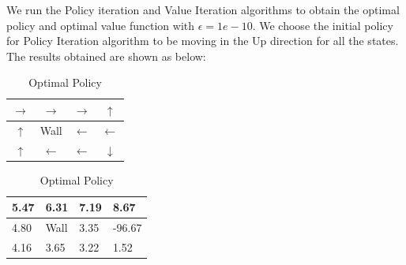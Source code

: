 \documentclass{article}
\begin{document}
\noindent %
We run the Policy iteration and Value Iteration algorithms to obtain the optimal policy and optimal value function with $\epsilon = 1e-10$.
We choose the initial policy for Policy Iteration algorithm to be moving in the Up direction for all the states. The results obtained are shown as below:

\begin{table}[H]
    \renewcommand{\arraystretch}{2}
    \begin{minipage}{.5\textwidth}
        \begin{center}
        \begin{tabular}{ | c | c| c | c | } 
            \hline
            $\rightarrow$ & $\rightarrow$ & $\rightarrow$ & \cellcolor{green!25}$\uparrow$ \\ 
            \hline
            $\uparrow$ & \cellcolor{gray!50}Wall & $\leftarrow$ & \cellcolor{red!25}$\leftarrow$ \\ 
            \hline
            $\uparrow$ & $\leftarrow$ & $\leftarrow$ & $\downarrow$ \\ 
            \hline
        \end{tabular}
        \caption{Optimal Policy}
        \end{center}
    \end{minipage}%
    \begin{minipage}{.5\textwidth}
        \begin{center}
        \begin{tabular}{ | m{1cm} | m{1cm}| m{1cm} | m{1cm} | } 
            \hline
            5.47 & 6.31 & 7.19 & \cellcolor{green!25}8.67 \\ 
            \hline
            4.80 & \cellcolor{gray!25}Wall & 3.35 & \cellcolor{red!25}-96.67 \\ 
            \hline
            4.16 & 3.65 & 3.22 & 1.52 \\ 
            \hline
        \end{tabular}
        \caption{Optimal Policy}
    \end{center}
    \end{minipage}%
    \renewcommand{\arraystretch}{1}
\end{table}
\end{document}
